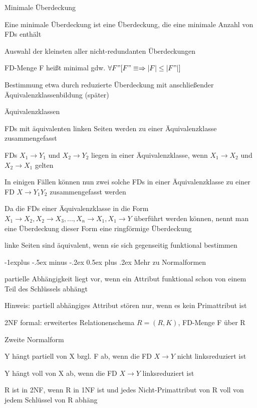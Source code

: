 \documentclass[a4paper]{article}
\makeatletter
\renewcommand{\subsection}{\@startsection{subsection}{2}{0mm}%
                                {-1explus -.5ex minus -.2ex}%
                                {0.5ex plus .2ex}%
                                {\normalfont\normalsize\bfseries}}
\makeatother
\begin{document}
\begin{multicols}{3}
Minimale Überdeckung
\begin{itemize*}
    \item Eine minimale Überdeckung ist eine Überdeckung, die eine minimale Anzahl von FDs enthält
    \item Auswahl der kleinsten aller nicht-redundanten Überdeckungen
    \item FD-Menge F heißt minimal gdw. $\forall F" [F"\equiv \Rightarrow |F|\leq |F"|]$
    \item Bestimmung etwa durch reduzierte Überdeckung mit anschließender Äquivalenzklassenbildung (später)
\end{itemize*}

Äquivalenzklassen
\begin{itemize*}
    \item FDs mit äquivalenten linken Seiten werden zu einer Äquivalenzklasse zusammengefasst
    \item FDs $X_1 \rightarrow Y_1$ und $X_2\rightarrow Y_2$ liegen in einer Äquivalenzklasse, wenn $X_1\rightarrow X_2$ und $X_2\rightarrow X_1$ gelten
    \item In einigen Fällen können nun zwei solche FDs in einer Äquivalenzklasse zu einer FD $X\rightarrow Y_1 Y_2$ zusammengefasst werden
    \item Da die FDs einer Äquivalenzklasse in die Form $X_1\rightarrow X_2, X_2\rightarrow X_3,..., X_n\rightarrow X_1, X_1\rightarrow Y$ überführt werden können, nennt man eine Überdeckung dieser Form eine ringförmige Überdeckung
    \item linke Seiten sind äquivalent, wenn sie sich gegenseitig funktional bestimmen
\end{itemize*}


\subsection{Mehr zu Normalformen}
\begin{itemize*}
    \item partielle Abhängigkeit liegt vor, wenn ein Attribut funktional schon von einem Teil des Schlüssels abhängt
    \item Hinweis: partiell abhängiges Attribut stören nur, wenn es kein Primattribut ist
    \item 2NF formal: erweitertes Relationenschema $R = (R, K)$, FD-Menge F über R
\end{itemize*}

Zweite Normalform
\begin{itemize*}
    \item Y hängt partiell von X bzgl. F ab, wenn die FD $X\rightarrow Y$ nicht linksreduziert ist
    \item Y hängt voll von X ab, wenn die FD $X\rightarrow Y$ linksreduziert ist
    \item R ist in 2NF, wenn R in 1NF ist und jedes Nicht-Primattribut von R voll von jedem Schlüssel von R abhäng
\end{itemize*}


\end{multicols}
\end{document}
